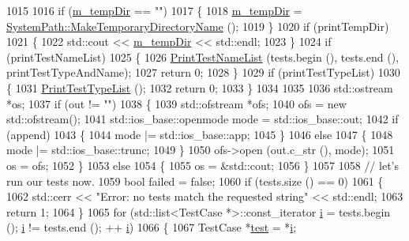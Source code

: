 \begin{DoxyCode}
1015 
1016   \textcolor{keywordflow}{if} (\hyperlink{classns3_1_1TestRunnerImpl_a659f2ebce866a2fc11e8dfee14b8b802}{m\_tempDir} == \textcolor{stringliteral}{""})
1017     \{
1018       \hyperlink{classns3_1_1TestRunnerImpl_a659f2ebce866a2fc11e8dfee14b8b802}{m\_tempDir} = \hyperlink{group__systempath_ga271d7de64c9f6454db57fe21bc51c5d0}{SystemPath::MakeTemporaryDirectoryName} ();
1019     \}
1020   \textcolor{keywordflow}{if} (printTempDir)
1021     \{
1022       std::cout << \hyperlink{classns3_1_1TestRunnerImpl_a659f2ebce866a2fc11e8dfee14b8b802}{m\_tempDir} << std::endl;
1023     \}
1024   \textcolor{keywordflow}{if} (printTestNameList)
1025     \{
1026       \hyperlink{classns3_1_1TestRunnerImpl_a9bd9699afbbe1a774e928637621b47c0}{PrintTestNameList} (tests.begin (), tests.end (), printTestTypeAndName);
1027       \textcolor{keywordflow}{return} 0;
1028     \}
1029   \textcolor{keywordflow}{if} (printTestTypeList)
1030     \{
1031       \hyperlink{classns3_1_1TestRunnerImpl_a187a7decf379b368fb8c7453671f9f32}{PrintTestTypeList} ();
1032       \textcolor{keywordflow}{return} 0;
1033     \}
1034   
1035 
1036   std::ostream *os;
1037   \textcolor{keywordflow}{if} (out != \textcolor{stringliteral}{""})
1038     \{
1039       std::ofstream *ofs;
1040       ofs = \textcolor{keyword}{new} std::ofstream();
1041       std::ios\_base::openmode mode = std::ios\_base::out;
1042       \textcolor{keywordflow}{if} (append)
1043         \{
1044           mode |= std::ios\_base::app;
1045         \}
1046       \textcolor{keywordflow}{else}
1047         \{
1048           mode |= std::ios\_base::trunc;
1049         \}
1050       ofs->open (out.c\_str (), mode);
1051       os = ofs;
1052     \}
1053   \textcolor{keywordflow}{else}
1054     \{
1055       os = &std::cout;
1056     \}
1057 
1058   \textcolor{comment}{// let's run our tests now.}
1059   \textcolor{keywordtype}{bool} failed = \textcolor{keyword}{false};
1060   \textcolor{keywordflow}{if} (tests.size () == 0)
1061     \{
1062       std::cerr << \textcolor{stringliteral}{"Error:  no tests match the requested string"} << std::endl;
1063       \textcolor{keywordflow}{return} 1;
1064     \}
1065   \textcolor{keywordflow}{for} (std::list<TestCase *>::const\_iterator \hyperlink{bernuolliDistribution_8m_a6f6ccfcf58b31cb6412107d9d5281426}{i} = tests.begin (); \hyperlink{bernuolliDistribution_8m_a6f6ccfcf58b31cb6412107d9d5281426}{i} != tests.end (); ++
      \hyperlink{bernuolliDistribution_8m_a6f6ccfcf58b31cb6412107d9d5281426}{i})
1066     \{
1067       TestCase *\hyperlink{main-test-sync_8cc_a708a4c1a4d0c4acc4c447310dd4db27f}{test} = *\hyperlink{bernuolliDistribution_8m_a6f6ccfcf58b31cb6412107d9d5281426}{i};

\end{DoxyCode}
